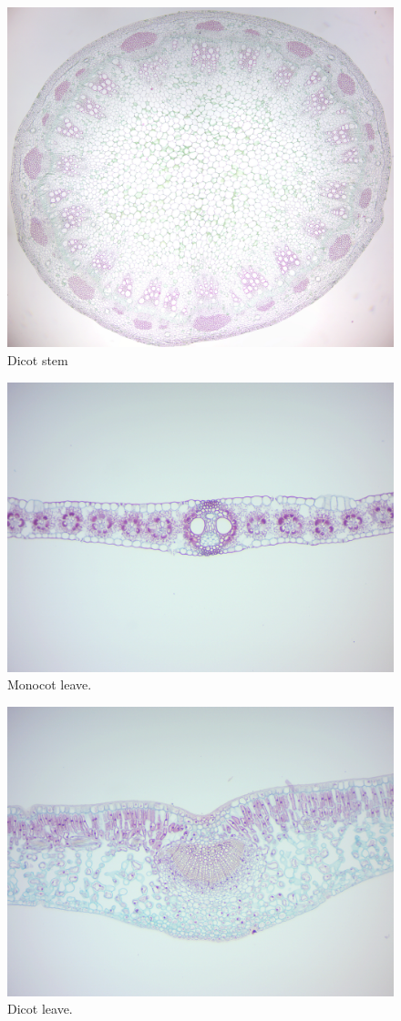 \begin{figure}

{\centering \includegraphics[width=0.7\linewidth]{./figures/gymnosperms/dicot_stem}

}

\caption{Dicot stem}\label{fig:dicotstem}
\end{figure}

\begin{figure}

{\centering \includegraphics[width=0.7\linewidth]{./figures/gymnosperms/monocot_leave}

}

\caption{Monocot leave.}\label{fig:monocotleave}
\end{figure}

\begin{figure}

{\centering \includegraphics[width=0.7\linewidth]{./figures/gymnosperms/dicot_leave}

}

\caption{Dicot leave.}\label{fig:dicotleave}
\end{figure}

